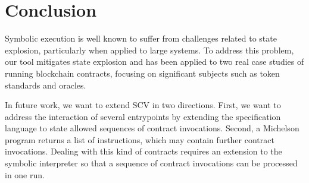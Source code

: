 \documentclass[runningheads]{llncs}
\begin{document}
\section{Conclusion}
\label{sec:concl-sect-append}
Symbolic execution is well known to suffer from challenges related to state explosion, particularly when applied to large systems. To address this problem, our tool mitigates state explosion and has been applied to two real case studies of running blockchain contracts, focusing on significant subjects such as token standards and oracles.

In future work, we want to extend SCV in two directions. 
First, we want to address the interaction of several entrypoints by
extending the specification language to state allowed sequences of
contract invocations.  Second, a Michelson program returns a list of instructions, which may contain
further contract invocations. Dealing with this kind of contracts
requires an extension to the symbolic interpreter so that a sequence
of contract invocations can be processed in one run.

\newpage



\newpage

\end{document}
